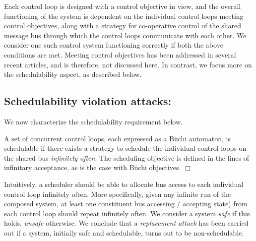 \noindent
Each control loop is designed with a control objective in view, and the overall functioning of the system is dependent on the individual control loops meeting control objectives, along with a strategy for co-operative control of the shared message bus through which the control loops communicate with each other. We consider one such control system functioning correctly if both the above conditions are met. Meeting control objectives has been addressed in several recent articles, and is therefore, not discussed here. In contrast, we focus more on the schedulability aspect, as described below. 

\subsection{Schedulability violation attacks:} 
\noindent
We now characterize the schedulability requirement below. 

\begin{definition}
A set of concurrent control loops, each expressed as a B\"{u}chi automaton, is schedulable if there exists a strategy to schedule the individual control loops on the shared bus {\em infinitely often}.
The scheduling objective is defined in the lines of infinitary acceptance, as is the case with B\"{u}chi objectives. $\Box$
\end{definition}
\noindent
Intuitively, a scheduler should be able to allocate bus access to each individual control loop infinitely often. More specifically, given any infinite run of the composed system, at least one constituent  bus accessing / accepting state) from each control loop should repeat infinitely often. We consider a system {\em safe} if this holds, {\em unsafe} otherwise. 
We conclude that a {\em replacement attack} has been carried out if a system,  initially safe and schedulable, turns out to be non-schedulable. \\
%

